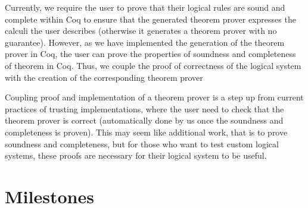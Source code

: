 \documentclass[onecolumn]{report}
\begin{document}
\par

Currently, we require the user to prove that their logical rules are sound and
complete within Coq to ensure that the generated theorem prover expresses the
calculi the user describes (otherwise it generates a theorem prover with
no guarantee). However, as we have implemented the generation of the theorem
prover in Coq, the user can prove the properties of soundness and completeness
of theorem in Coq. Thus, we couple the proof of correctness of the logical
system with the creation of the corresponding theorem prover

\par

Coupling proof and implementation of a theorem prover is a step up from current
practices of trusting implementations, where the user need to check that the
theorem prover is correct (automatically done by us once the soundness and
completeness is proven). This may seem like additional work, that is to prove
soundness and completeness, but for those who want to test custom logical
systems, these proofs are necessary for their logical system to be useful.

\section*{Milestones}
\end{document}
